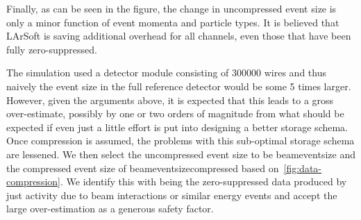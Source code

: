 Finally, as can be seen in the figure, the change in uncompressed
event size is only a minor function of event momenta and particle types.
It is believed that LArSoft is saving additional overhead for all
channels, even those that have been fully zero-suppressed.

The simulation used a detector module consisting of 300000 wires and
thus naively the event size in the full reference detector would be some 5 times
larger.
However, given the arguments above, it is expected that this leads to
a gross over-estimate, possibly by one or two orders of magnitude from
what should be expected if even just a little effort is put into
designing a better storage schema.
Once compression is assumed, the problems with this sub-optimal
storage schema are lessened.
We then select the uncompressed event size to be beameventsize and
the compressed event size of beameventsizecompressed based
on~\ref{fig:data-compression}.
We identify this with being the zero-suppressed data produced by just
activity due to beam interactions or similar energy events and accept
the large over-estimation as a generous safety factor.






